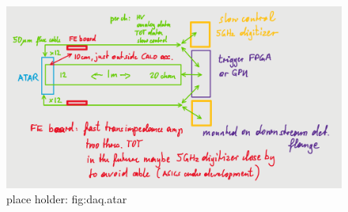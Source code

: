 \label{section:daq}


\begin{figure}[h!]
\centering
\includegraphics[scale=0.35]{sections/figures/daq_atar.png}
\caption{place holder: fig:daq.atar}
\label{fig:daq.atar}
\end{figure}
